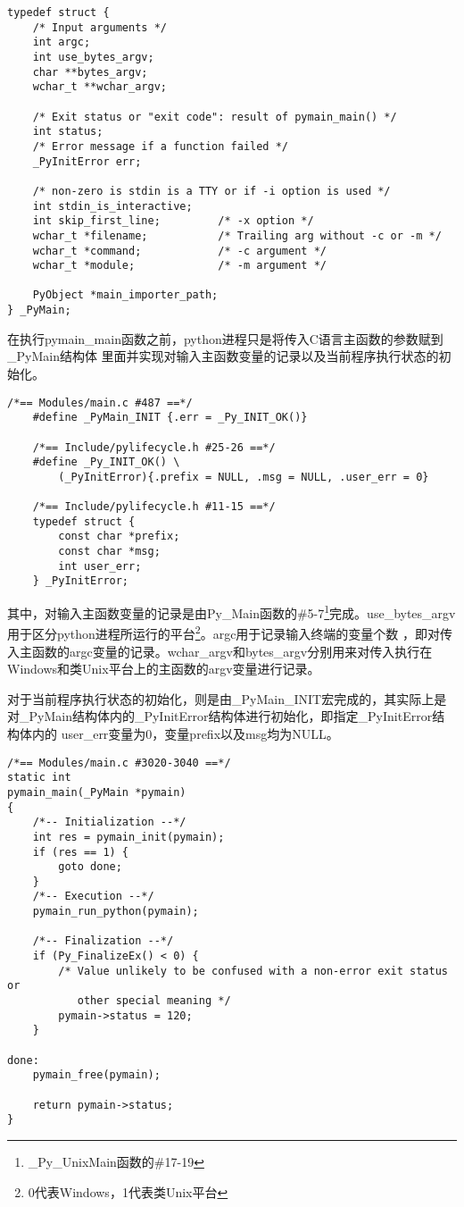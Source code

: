 \documentclass[UTF8]{book}
\begin{document}
\begin{lstlisting}[language={[ANSI]C}]
typedef struct {
    /* Input arguments */
    int argc;
    int use_bytes_argv;
    char **bytes_argv;
    wchar_t **wchar_argv;

    /* Exit status or "exit code": result of pymain_main() */
    int status;
    /* Error message if a function failed */
    _PyInitError err;

    /* non-zero is stdin is a TTY or if -i option is used */
    int stdin_is_interactive;
    int skip_first_line;         /* -x option */
    wchar_t *filename;           /* Trailing arg without -c or -m */
    wchar_t *command;            /* -c argument */
    wchar_t *module;             /* -m argument */

    PyObject *main_importer_path;
} _PyMain;
\end{lstlisting}\par
在执行pymain\_main函数之前，python进程只是将传入C语言主函数的参数赋到\_PyMain结构体
里面并实现对输入主函数变量的记录以及当前程序执行状态的初始化。\par
\begin{lstlisting}[language={[ANSI]C}]
    /*== Modules/main.c #487 ==*/
    #define _PyMain_INIT {.err = _Py_INIT_OK()}
    
    /*== Include/pylifecycle.h #25-26 ==*/
    #define _Py_INIT_OK() \
        (_PyInitError){.prefix = NULL, .msg = NULL, .user_err = 0}
    
    /*== Include/pylifecycle.h #11-15 ==*/
    typedef struct {
        const char *prefix;
        const char *msg;
        int user_err;
    } _PyInitError;
    \end{lstlisting}
    其中，对输入主函数变量的记录是由Py\_Main函数的\#5-7\footnote[1]{\_Py\_UnixMain函数的\#17-19}完成。use\_bytes\_argv用于区分python进程所运行的平台\footnote[2]{0代表Windows，1代表类Unix平台}。argc用于记录输入终端的变量个数
    ，即对传入主函数的argc变量的记录。wchar\_argv和bytes\_argv分别用来对传入执行在Windows和类Unix平台上的主函数的argv变量进行记录。\par
    对于当前程序执行状态的初始化，则是由\_PyMain\_INIT宏完成的，其实际上是对\_PyMain结构体内的\_PyInitError结构体进行初始化，即指定\_PyInitError结构体内的
    user\_err变量为0，变量prefix以及msg均为NULL。\par
\begin{lstlisting}[language={[ANSI]C}]
/*== Modules/main.c #3020-3040 ==*/
static int
pymain_main(_PyMain *pymain)
{
    /*-- Initialization --*/
    int res = pymain_init(pymain);
    if (res == 1) {
        goto done;
    }
    /*-- Execution --*/
    pymain_run_python(pymain);

    /*-- Finalization --*/
    if (Py_FinalizeEx() < 0) {
        /* Value unlikely to be confused with a non-error exit status or
           other special meaning */
        pymain->status = 120;
    }

done:
    pymain_free(pymain);

    return pymain->status;
}
\end{lstlisting}
\end{document}
